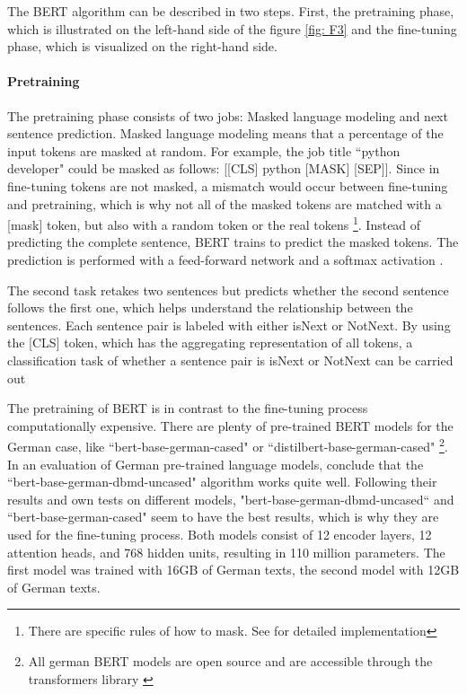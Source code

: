\documentclass[12pt, a4paper, titlepage]{article}
\begin{document}
The \ac{BERT} algorithm can be described in two steps. First, the pretraining phase, which is illustrated on the left-hand side of the figure \ref{fig: F3} and the fine-tuning phase, which is visualized on the right-hand side. 

\paragraph{Pretraining}
The pretraining phase consists of two jobs: Masked language modeling and next sentence prediction. Masked language modeling means that a percentage of the input tokens are masked at random. For example, the job title ``python developer" could be masked as follows: [[CLS] python [MASK] [SEP]]. Since in fine-tuning tokens are not masked, a mismatch would occur between fine-tuning and pretraining, which is why not all of the masked tokens are matched with a [mask] token, but also with a random token or the real tokens \footnote{There are specific rules of how to mask. See \citet{devlin2018} for detailed implementation}. Instead of predicting the complete sentence, \ac{BERT} trains to predict the masked tokens. The prediction is performed with a feed-forward network and a softmax activation \citep{devlin2018,ravichandiran2021}. 

The second task retakes two sentences but predicts whether the second sentence follows the first one, which helps understand the relationship between the sentences. Each sentence pair is labeled with either isNext or NotNext. By using the [CLS] token, which has the aggregating representation of all tokens, a classification task of whether a sentence pair is isNext or NotNext can be carried out \citep{ravichandiran2021,devlin2018}

The pretraining of \ac{BERT} is in contrast to the fine-tuning process computationally expensive. There are plenty of pre-trained \ac{BERT} models for the German case, like ``bert-base-german-cased" or ``distilbert-base-german-cased" \footnote{All german \ac{BERT} models are open source and are accessible through the transformers library \citep{wolf2020}}. In an evaluation of German pre-trained language models, \citep{assenmacher2021} conclude that the ``bert-base-german-dbmd-uncased" algorithm works quite well. Following their results and own tests on different models, "bert-base-german-dbmd-uncased`` and ``bert-base-german-cased" seem to have the best results, which is why they are used for the fine-tuning process. Both models consist of 12 encoder layers, 12 attention heads, and 768 hidden units, resulting in 110 million parameters. The first model was trained with 16GB of German texts, the second model with 12GB of German texts. 
\end{document}
